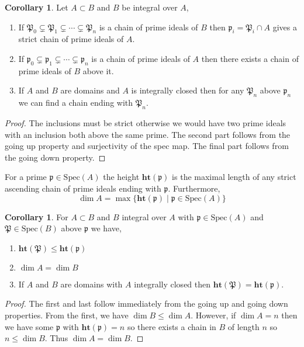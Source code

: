 \documentclass[12pt]{article}
\newcommand{\spec}[1]{\mathrm{Spec}\left( #1 \right)}
\newcommand{\p}{\mathfrak{p}}
\renewcommand{\P}{\mathfrak{P}}
\theoremstyle{remark}
\theoremstyle{definition}
\newtheorem{corollary}[theorem]{Corollary}
\newenvironment{definition}[1][Definition:]{\begin{trivlist}
\item[\hskip \labelsep {\bfseries #1}]}{\end{trivlist}}
\begin{document}
\begin{corollary}
Let $A \subset B$ and $B$ be integral over $A$,
\begin{enumerate}
\item If $\P_0 \subsetneq \P_1 \subsetneq \cdots \subsetneq \P_n$ is a chain of prime ideals of $B$ then $\p_i = \P_i \cap A$ gives a strict chain of prime ideals of $A$.
\item If $\p_0 \subsetneq \p_1 \subsetneq \cdots \subsetneq \p_n$ is a chain of prime ideals of $A$ then there exists a chain of prime ideals of $B$ above it.
\item If $A$ and $B$ are domains and $A$ is integrally closed then for any $\P_n$ above $\p_n$ we can find a chain ending with $\P_n$.   
\end{enumerate}
\end{corollary}

\begin{proof} 
The inclusions must be strict otherwise we would have two prime ideals with an inclusion both above the same prime. The second part follows from the going up property and surjectivity of the spec map. The final part follows from the going down property. 
\end{proof}

\newcommand{\height}[1]{\mathbf{ht}\left( #1 \right)}


\begin{definition}
For a prime $\p \in \spec{A}$ the height $\height{\p}$ is the maximal length of any strict ascending chain of prime ideals ending with $\p$. Furthermore,
\[ \dim{A} = \max\{ \height{\p} \mid \p \in \spec{A} \} \] 
\end{definition}

\begin{corollary}
For $A \subset B$ and $B$ integral over $A$ with $\p \in \spec{A}$ and $\P \in \spec{B}$ above $\p$ we have,
\begin{enumerate}
\item $\height{\P} \le \height{\p}$
\item $\dim{A} = \dim{B}$
\item If $A$ and $B$ are domains with $A$ integrally closed then $\height{\P} = \height{\p}$. 
\end{enumerate}
\end{corollary}

\begin{proof}
The first and last follow immediately from the going up and going down properties. From the first, we have $\dim{B} \le \dim{A}$. However, if $\dim{A} = n$ then we have some $\p$ with $\height{\p} = n$ so there exists a chain in $B$ of length $n$ so $n \le \dim{B}$. Thus $\dim{A} = \dim{B}$.
\end{proof}
\end{document}
